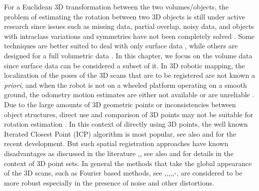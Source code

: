 \documentclass{UCF_ETD}
\begin{document}
For a Euclidean $3$D transformation between the two volumes/objects, the problem of estimating the rotation between two $3$D objects is still under active research since issues such as missing data, partial overlap, noisy data, and objects with intraclass variations and symmetries have not been completely solved \cite{Salah2013}. Some techniques are better suited to deal with only surface data \cite{Salah2013}, while others are designed for a full volumetric data \cite{Bulow2013}. In this chapter, we focus on the volume data since surface data can be considered a subset of it. In $3$D robotic mapping, the localization of the poses of the $3$D scans that are to be registered are not known a \emph{priori}, and when the robot is not on a wheeled platform operating on a smooth ground, the odometry motion estimates are either not available or are unreliable \cite{Bulow2013}. Due to the large amounts of $3$D geometric points or inconsistencies between object structures, direct use and comparison of 3D points may not be suitable for rotation estimation \cite{Bulow2013}. In this context of directly using $3$D points, the well known Iterated Closest Point (ICP) algorithm \cite{McKay1992} is most popular, see also \cite{Jiaolong2013} and \cite{Jiaolong2016} for the recent development. But such spatial registration approaches have known disadvantages as discussed in the literature \cite{Salah2013},\cite{Bulow2013}, see also \cite{Radu2011} and \cite{Radu2015} for details in the context of $3$D point sets. In general the methods that take the global appearance of the $3$D scans, such as Fourier based methods, see \cite{Sun2014},\cite{Wang2012},\cite{Luce2014},\cite{Salah2013},\cite{Bulow2013},\cite{Lucchese02}-\cite{Bermanis2010}, are considered to be more robust especially in the presence of noise and other distortions.
\end{document}
